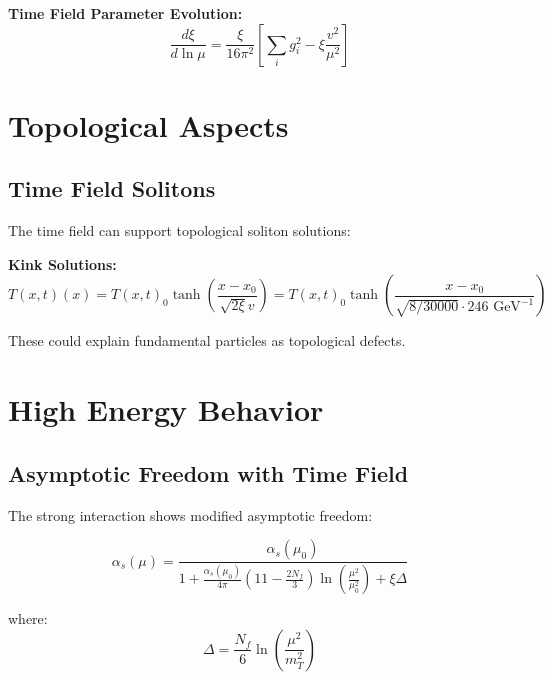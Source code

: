 \documentclass[12pt,a4paper]{report}
\newcommand{\Tfield}{T(x,t)}  %
\newcommand{\xipar}{\xi}      %
\begin{document}
	\textbf{Time Field Parameter Evolution:}
	\begin{equation}
		\frac{d\xipar}{d\ln\mu} = \frac{\xipar}{16\pi^2} \left[\sum_i g_i^2 - \xipar \frac{v^2}{\mu^2}\right]
	\end{equation}
	
	\section{Topological Aspects}\label{sec:topological_aspects}
	
	\subsection{Time Field Solitons}\label{subsec:timefield_solitons}
	
	The time field can support topological soliton solutions:
	
	\textbf{Kink Solutions:}
	\begin{equation}\label{eq:kink_solution}
		\Tfield(x) = \Tfield_0 \tanh\left(\frac{x - x_0}{\sqrt{2\xipar} v}\right) = \Tfield_0 \tanh\left(\frac{x - x_0}{\sqrt{8/30000} \cdot 246 \text{ GeV}^{-1}}\right)
	\end{equation}
	
	These could explain fundamental particles as topological defects.
	
	\section{High Energy Behavior}\label{sec:high_energy_behavior}
	
	\subsection{Asymptotic Freedom with Time Field}\label{subsec:asymptotic_freedom}
	
	The strong interaction shows modified asymptotic freedom:
	
	\begin{equation}
		\alpha_s(\mu) = \frac{\alpha_s(\mu_0)}{1 + \frac{\alpha_s(\mu_0)}{4\pi} \left(11 - \frac{2N_f}{3}\right) \ln\left(\frac{\mu^2}{\mu_0^2}\right) + \xipar \Delta}
	\end{equation}
	
	where:
	\begin{equation}
		\Delta = \frac{N_f}{6} \ln\left(\frac{\mu^2}{m_T^2}\right)
	\end{equation}
	
\end{document}
